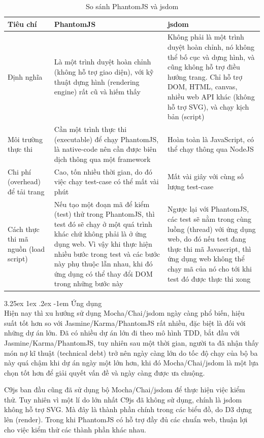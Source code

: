 \documentclass[12pt,a4paper]{article}
\makeatletter
\newcommand{\myparagraph}[1]{\paragraph{#1}\mbox{}\\} %
\renewcommand\paragraph{\@startsection{paragraph}{5}{\z@}%
  {3.25ex \@plus1ex \@minus.2ex}%
  {-1em}%
  {\normalfont\normalsize\bfseries}}
\makeatother
\begin{document}
\begin{table}
\begin{tabu} to 1\textwidth { | X[l] | X[l] | X[l] | }
\hline
\textbf{Tiêu chí} & \textbf{PhantomJS} & \textbf{jsdom}\\
\hline\hline
Định nghĩa & Là một trình duyệt hoàn chỉnh (không hỗ trợ giao diện), với kỹ thuật dựng hình (rendering engine) rất cũ và hiếm thấy & Không phải là một trình duyệt hoàn chỉnh, nó không thể bố cục và dựng hình, và cũng không hỗ trợ điều hướng trang. Chỉ hỗ trợ DOM, HTML, canvas, nhiều web API khác (không hỗ trợ SVG), và chạy kịch bản (script)\\
\hline
Môi trường thực thi & Cần một trình thực thi (executable) để chạy PhantomJS, là native-code nên cần được biên dịch thông qua một framework & Hoàn toàn là JavaScript, có thể chạy thông qua NodeJS \\
\hline
Chi phí (overhead) để tải trang & Cao, tốn nhiều thời gian, do đó việc chạy test-case có thể mất vài phút & Mất vài giây với cùng số lượng test-case \\
\hline
Cách thực thi mã nguồn (load script) & Nếu tạo một đoạn mã  để kiểm (test) thử trong PhantomJS, thì test đó sẽ chạy ở một quá trình khác chứ không phải là ở ứng dụng web. Vì vậy khi thực hiện nhiều bước trong test và các bước này phụ thuộc lẫn nhau, khi đó ứng dụng có thể thay đổi DOM trong những bước này & Ngược lại với PhantomJS, các test sẽ nằm trong cùng luồng (thread) với ứng dụng web, do đó nếu test đang thực thi mã Javascript, thì ứng dụng web không thể chạy mã của nó cho tới khi test đó được thực thi xong\\
\hline
\end{tabu}
\caption{So sánh PhantomJS và jsdom}
\label{table:phantomjs_jsdom}
\end{table}

\myparagraph{Ứng dụng}
Hiện nay thì xu hướng sử dụng Mocha/Chai/jsdom ngày càng phổ biến, hiệu suất tốt hơn so với Jasmine/Karma/PhantomJS rất nhiều, đặc biệt là đối với những dự án lớn. Đã có nhiều dự án lớn đi theo mô hình TDD, bắt đầu với Jasmine/Karma/PhantomJS, tuy nhiên sau một thời gian, người ta đã nhận thấy món nợ kĩ thuật (technical debt) trở nên ngày càng lớn do tốc độ chạy của bộ ba này quá chậm khi dự án ngày một lớn hơn, khi đó Mocha/Chai/jsdom là một lựa chọn tốt hơn để giải quyết vấn đề và ngày càng được ưa chuộng.

C9js ban đầu cũng đã sử dụng bộ Mocha/Chai/jsdom để thực hiện việc kiểm thử. Tuy nhiên vì một lí do lớn nhất C9js đã không sử dụng, chính là jsdom không hỗ trợ SVG. Mà đây là thành phần chính trong các biểu đồ, do D3 dựng lên (render). Trong khi PhantomJS có hỗ trợ đầy đủ các chuẩn web, thuận lợi cho việc kiểm thử các thành phần khác nhau.
\end{document}
